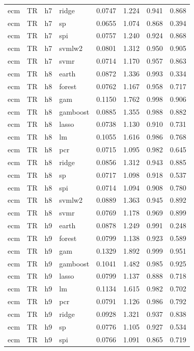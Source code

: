 \begin{ThreePartTable}
\begin{longtable}[t]{llclcccc}
ecm & TR & h7 & ridge & 0.0747 & 1.224 & 0.941 & 0.868\\
ecm & TR & h7 & sp & 0.0655 & 1.074 & 0.868 & 0.394\\
ecm & TR & h7 & spi & 0.0757 & 1.240 & 0.924 & 0.868\\
ecm & TR & h7 & svmlw2 & 0.0801 & 1.312 & 0.950 & 0.905\\
ecm & TR & h7 & svmr & 0.0714 & 1.170 & 0.957 & 0.863\\
\addlinespace
ecm & TR & h8 & earth & 0.0872 & 1.336 & 0.993 & 0.334\\
ecm & TR & h8 & forest & 0.0762 & 1.167 & 0.958 & 0.717\\
ecm & TR & h8 & gam & 0.1150 & 1.762 & 0.998 & 0.906\\
ecm & TR & h8 & gamboost & 0.0885 & 1.355 & 0.988 & 0.882\\
ecm & TR & h8 & lasso & 0.0738 & 1.130 & 0.910 & 0.731\\
ecm & TR & h8 & lm & 0.1055 & 1.616 & 0.986 & 0.768\\
ecm & TR & h8 & pcr & 0.0715 & 1.095 & 0.982 & 0.645\\
ecm & TR & h8 & ridge & 0.0856 & 1.312 & 0.943 & 0.885\\
ecm & TR & h8 & sp & 0.0717 & 1.098 & 0.918 & 0.537\\
ecm & TR & h8 & spi & 0.0714 & 1.094 & 0.908 & 0.780\\
ecm & TR & h8 & svmlw2 & 0.0889 & 1.363 & 0.945 & 0.892\\
ecm & TR & h8 & svmr & 0.0769 & 1.178 & 0.969 & 0.899\\
\addlinespace
ecm & TR & h9 & earth & 0.0878 & 1.249 & 0.991 & 0.248\\
ecm & TR & h9 & forest & 0.0799 & 1.138 & 0.923 & 0.589\\
ecm & TR & h9 & gam & 0.1329 & 1.892 & 0.999 & 0.951\\
ecm & TR & h9 & gamboost & 0.1041 & 1.482 & 0.985 & 0.925\\
ecm & TR & h9 & lasso & 0.0799 & 1.137 & 0.888 & 0.718\\
ecm & TR & h9 & lm & 0.1134 & 1.615 & 0.982 & 0.702\\
ecm & TR & h9 & pcr & 0.0791 & 1.126 & 0.986 & 0.792\\
ecm & TR & h9 & ridge & 0.0928 & 1.321 & 0.937 & 0.838\\
ecm & TR & h9 & sp & 0.0776 & 1.105 & 0.927 & 0.534\\
ecm & TR & h9 & spi & 0.0766 & 1.091 & 0.865 & 0.719\\

\end{longtable}
\end{ThreePartTable}
